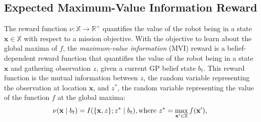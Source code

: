 \documentclass{styles/svproc}
\DeclareMathOperator*{\maximum}{max} %
\newcommand{\x}{\mathbf{x}}
\begin{document}
\subsection{Expected Maximum-Value Information Reward}
\label{sec:mes}
The reward function $\nu: \mathbb{X} \to \mathbb{R}^+$ quantifies the value of the robot being in a state $\x \in \mathbb{X}$ with respect to a mission objective. With the objective to learn about the global maxima of $f$, the \textit{maximum-value information} (MVI) reward is a belief-dependent reward function \cite{araya2010pomdp} that quantifies the value of the robot being in a state $\x$ and gathering observation $z$, given a current GP belief state $b_t$.  This reward function is the mutual information between $z$, the random variable representing the observation at location $\x$, and $z^*$, the random variable representing the value of the function $f$ at the global maxima: 
\begin{equation}
\nu(\x \mid  b_t) = I(\{\x, z\} ; z^* \mid b_t), \text{where } z^* = \maximum_{\x' \in \mathbb{X}} f(\x'), \\
\label{eq:reward}
\end{equation}
\end{document}
